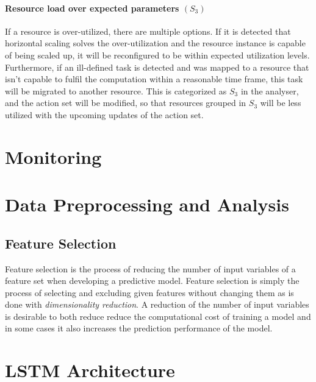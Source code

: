 \paragraph*{Resource load over expected parameters $(S_3)$} 
If a resource is over-utilized, there are multiple options. If it is detected that horizontal scaling solves the over-utilization and the resource instance is capable of being scaled up, it will be reconfigured to be within expected utilization levels. Furthermore, if an ill-defined task is detected and was mapped to a resource that isn't capable to fulfil the computation within a reasonable time frame, this task will be migrated to another resource. 
This is categorized as $S_3$ in the analyser, and the action set will be modified, so that resources grouped in $S_3$ will be less utilized with the upcoming updates of the action set. \cite{kimovskiBigDataPipeline2022}


\section{Monitoring}
\label{sec:monitoring-architecture}

\section{Data Preprocessing and Analysis}
\label{sec:data-preprocessing-and-analysis-architecture}

  \subsection{Feature Selection}
  \label{sec:feature-selection-data-preprocessing-architecture}

    Feature selection is the process of reducing the number of input variables of a feature set when developing a predictive model.
    Feature selection is simply the process of selecting and excluding given features without changing them as is done with \emph{dimensionality reduction}.
    A reduction of the number of input variables is desirable to both reduce reduce the computational cost of training a model and in some cases it also increases the prediction performance of the model.


  
\section{LSTM Architecture}
\label{sec:lstm-architecture-and-implementation}


